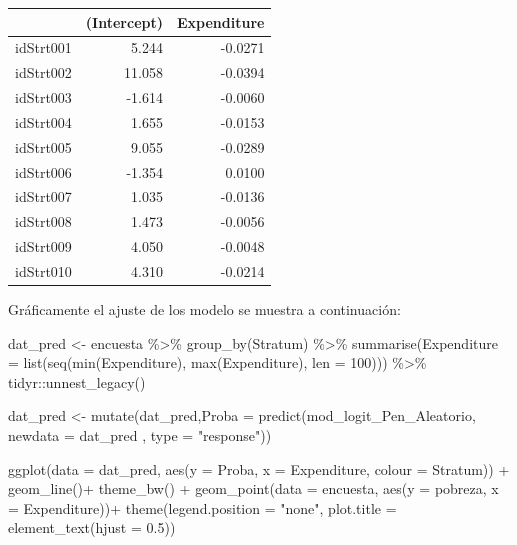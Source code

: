 \documentclass[
  12pt,
]{book}
\newenvironment{Shaded}{\begin{snugshade}}{\end{snugshade}}
\newcommand{\AttributeTok}[1]{\textcolor[rgb]{0.77,0.63,0.00}{#1}}
\newcommand{\DecValTok}[1]{\textcolor[rgb]{0.00,0.00,0.81}{#1}}
\newcommand{\FloatTok}[1]{\textcolor[rgb]{0.00,0.00,0.81}{#1}}
\newcommand{\FunctionTok}[1]{\textcolor[rgb]{0.00,0.00,0.00}{#1}}
\newcommand{\NormalTok}[1]{#1}
\newcommand{\OtherTok}[1]{\textcolor[rgb]{0.56,0.35,0.01}{#1}}
\newcommand{\SpecialCharTok}[1]{\textcolor[rgb]{0.00,0.00,0.00}{#1}}
\newcommand{\StringTok}[1]{\textcolor[rgb]{0.31,0.60,0.02}{#1}}
\begin{document}
\begin{tabular}{l|r|r}
\hline
  & (Intercept) & Expenditure\\
\hline
idStrt001 & 5.244 & -0.0271\\
\hline
idStrt002 & 11.058 & -0.0394\\
\hline
idStrt003 & -1.614 & -0.0060\\
\hline
idStrt004 & 1.655 & -0.0153\\
\hline
idStrt005 & 9.055 & -0.0289\\
\hline
idStrt006 & -1.354 & 0.0100\\
\hline
idStrt007 & 1.035 & -0.0136\\
\hline
idStrt008 & 1.473 & -0.0056\\
\hline
idStrt009 & 4.050 & -0.0048\\
\hline
idStrt010 & 4.310 & -0.0214\\
\hline
\end{tabular}

Gráficamente el ajuste de los modelo se muestra a continuación:

\begin{Shaded}
\begin{Highlighting}[]
\NormalTok{dat\_pred }\OtherTok{\textless{}{-}}\NormalTok{ encuesta }\SpecialCharTok{\%\textgreater{}\%} \FunctionTok{group\_by}\NormalTok{(Stratum) }\SpecialCharTok{\%\textgreater{}\%} 
  \FunctionTok{summarise}\NormalTok{(}\AttributeTok{Expenditure =} \FunctionTok{list}\NormalTok{(}\FunctionTok{seq}\NormalTok{(}\FunctionTok{min}\NormalTok{(Expenditure), }\FunctionTok{max}\NormalTok{(Expenditure), }\AttributeTok{len =} \DecValTok{100}\NormalTok{))) }\SpecialCharTok{\%\textgreater{}\%} 
\NormalTok{  tidyr}\SpecialCharTok{::}\FunctionTok{unnest\_legacy}\NormalTok{()}

\NormalTok{dat\_pred }\OtherTok{\textless{}{-}} \FunctionTok{mutate}\NormalTok{(dat\_pred,}\AttributeTok{Proba =} \FunctionTok{predict}\NormalTok{(mod\_logit\_Pen\_Aleatorio, }\AttributeTok{newdata =}\NormalTok{ dat\_pred , }\AttributeTok{type =} \StringTok{"response"}\NormalTok{))}

\FunctionTok{ggplot}\NormalTok{(}\AttributeTok{data =}\NormalTok{ dat\_pred,}
       \FunctionTok{aes}\NormalTok{(}\AttributeTok{y =}\NormalTok{ Proba, }\AttributeTok{x =}\NormalTok{ Expenditure,}
           \AttributeTok{colour =}\NormalTok{ Stratum)) }\SpecialCharTok{+}
   \FunctionTok{geom\_line}\NormalTok{()}\SpecialCharTok{+}   \FunctionTok{theme\_bw}\NormalTok{() }\SpecialCharTok{+}
  \FunctionTok{geom\_point}\NormalTok{(}\AttributeTok{data =}\NormalTok{ encuesta, }\FunctionTok{aes}\NormalTok{(}\AttributeTok{y =}\NormalTok{ pobreza, }\AttributeTok{x =}\NormalTok{ Expenditure))}\SpecialCharTok{+}
  \FunctionTok{theme}\NormalTok{(}\AttributeTok{legend.position =} \StringTok{"none"}\NormalTok{,}
        \AttributeTok{plot.title =} \FunctionTok{element\_text}\NormalTok{(}\AttributeTok{hjust =} \FloatTok{0.5}\NormalTok{))  }
\end{Highlighting}
\end{Shaded}
\end{document}
